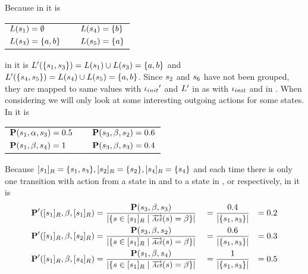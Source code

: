 \documentclass[preview]{standalone}
\begin{document}
\begin{exmp}
\noindent Because in \chgph it is
\begin{center}
	\begin{tabular}{lcl}
	${L}({s}_1) = \emptyset$& \quad\quad & ${L}({s}_4) = \{b\}$\\
	${L}({s}_3) = \{a,b\}$ & \quad\quad & ${L}({s}_5) = \{a\}$\\
	\end{tabular}
\end{center}
in \view it is ${L}'(\{{s}_1, {s}_3\}) = {L}({s}_1) \cup {L}({s}_3) = \{a,b\}$ and ${L}'(\{{s}_4, {s}_5\}) = {L}({s}_4) \cup {L}({s}_5) = \{a,b\}$. Since ${s}_2$ and ${s}_6$ have not been grouped, they are mapped to same values with ${\iota_{init}}'$ and ${L}'$ in \view as with ${\iota_{init}}$ and  in \chgph. When considering \trans we will only look at some interesting outgoing actions for some states. In \chgph it is 
\begin{center}
	\begin{tabular}{lcl}
 ${{\textbf{P}}}({s}_1,{\alpha},{s}_3) = 0.5$& \quad\quad &	${{\textbf{P}}}({s}_3,{\beta},{s}_2) = 0.6$ \\
 ${{\textbf{P}}}({s}_1,{\beta},{s}_4) = 1$ & \quad\quad &	${{\textbf{P}}}({s}_3,{\beta},{s}_3) = 0.4$ \\
	\end{tabular}
\end{center}

Because ${{[{s}_1]_{{R}}}} = \{{s}_1, {s}_3\}, {{[{s}_2]_{{R}}}} = \{{s}_2\}, {{[{s}_4]_{{R}}}} = \{{s}_4\}$ and each time there is only one transition with action \actionb from a state in \eqclassv[{\state_1}] and to a state in \eqclassv[{\state_1}], \eqclassv[{\state_2}] or \eqclassv[{\state_4}] respectively, in \view it is 
\begin{alignat*}{4}
	\trans'(\eqclassv[\state_1], \actionb, \eqclassv[\state_1]) &= \frac{\trans(\state_3,\actionb,\state_3)}{|\{\state \in \eqclassv[\state_1] \mid \outacts(\state) = \actionb\}|} &&= \frac{0.4}{|\{\state_1,\state_3\}|} &= 0.2\\
	\trans'(\eqclassv[\state_1], \actionb, \eqclassv[\state_2]) &= \frac{\trans(\state_3,\actionb,\state_2)}{|\{\state \in \eqclassv[\state_1] \mid \outacts(\state) = \actionb\}|} &&= \frac{0.6}{|\{\state_1,\state_3\}|} &= 0.3\\
	\trans'(\eqclassv[\state_1], \actionb, \eqclassv[\state_4]) &= \frac{\trans(\state_1,\actionb,\state_4)}{|\{\state \in \eqclassv[\state_1] \mid \outacts(\state) = \actionb\}|} &&= \frac{1}{|\{\state_1,\state_3\}|} &= 0.5
\end{alignat*}


\end{exmp}
\end{document}
